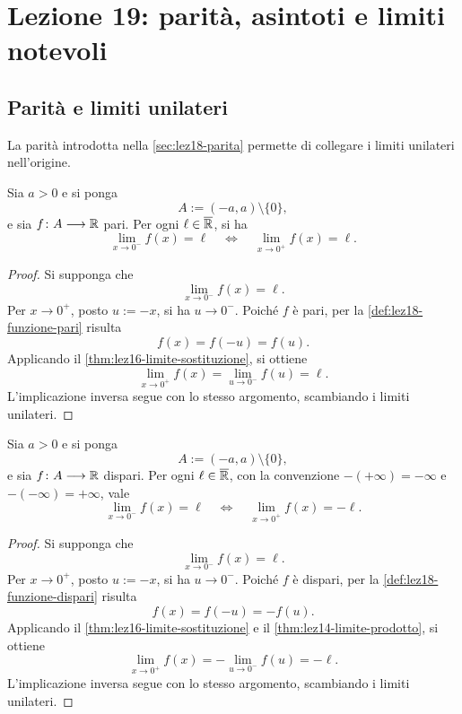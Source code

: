\chapter[Lezione 19 --- 17 novembre 2026]{Lezione 19: parità, asintoti e limiti notevoli}
\label{chap:lezione-19}

\section{Parità e limiti unilateri}
\label{sec:lez19-parita-limiti}

La parità introdotta nella \cref{sec:lez18-parita} permette
di collegare i limiti unilateri nell'origine.

\begin{proposition}
\label{prop:lez19-limiti-funzione-pari}
Sia \(a>0\) e si ponga
\[
  A:=(-a,a)\setminus\{0\},
\]
e sia \(f\colon A\longrightarrow\mathbb{R}\) pari.
Per ogni \(\ell\in\overline{\mathbb{R}}\), si ha
\[
  \lim_{x\to0^-}f(x)=\ell
  \quad\Longleftrightarrow\quad
  \lim_{x\to0^+}f(x)=\ell.
\]
\end{proposition}

\begin{proof}
Si supponga che
\[
  \lim_{x\to0^-}f(x)=\ell.
\]
Per \(x\to0^+\), posto \(u:=-x\), si ha \(u\to0^-\).
Poiché \(f\) è pari, per la
\cref{def:lez18-funzione-pari} risulta
\[
  f(x)=f(-u)=f(u).
\]
Applicando il \cref{thm:lez16-limite-sostituzione},
si ottiene
\[
  \lim_{x\to0^+}f(x)
  =\lim_{u\to0^-}f(u)=\ell.
\]
L'implicazione inversa segue con lo stesso argomento,
scambiando i limiti unilateri.
\end{proof}

\begin{proposition}
\label{prop:lez19-limiti-funzione-dispari}
Sia \(a>0\) e si ponga
\[
  A:=(-a,a)\setminus\{0\},
\]
e sia \(f\colon A\longrightarrow\mathbb{R}\) dispari.
Per ogni \(\ell\in\overline{\mathbb{R}}\), con la convenzione
\(-(+\infty)=-\infty\) e \(-(-\infty)=+\infty\), vale
\[
  \lim_{x\to0^-}f(x)=\ell
  \quad\Longleftrightarrow\quad
  \lim_{x\to0^+}f(x)=-\ell.
\]
\end{proposition}

\begin{proof}
Si supponga che
\[
  \lim_{x\to0^-}f(x)=\ell.
\]
Per \(x\to0^+\), posto \(u:=-x\), si ha \(u\to0^-\).
Poiché \(f\) è dispari, per la
\cref{def:lez18-funzione-dispari} risulta
\[
  f(x)=f(-u)=-f(u).
\]
Applicando il \cref{thm:lez16-limite-sostituzione}
e il \cref{thm:lez14-limite-prodotto},
si ottiene
\[
  \lim_{x\to0^+}f(x)
  =-\lim_{u\to0^-}f(u)=-\ell.
\]
L'implicazione inversa segue con lo stesso argomento,
scambiando i limiti unilateri.
\end{proof}

